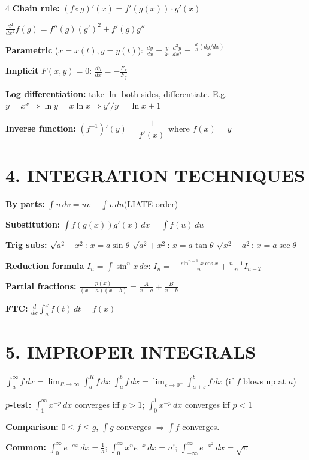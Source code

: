 \documentclass[8pt,a4paper,landscape]{extarticle}
\newcommand{\dx}{\,dx}
\begin{document}
\begin{multicols}{4}
\textbf{Chain rule:} $(f\circ g)'(x)=f'(g(x))\cdot g'(x)$

$\frac{d^2}{dx^2}f(g)=f''(g)(g')^2+f'(g)g''$

\textbf{Parametric} ($x=x(t),y=y(t)$):
$\frac{dy}{dx}=\frac{\dot y}{\dot x}$\qquad
$\frac{d^2y}{dx^2}=\frac{\frac{d}{dt}(dy/dx)}{\dot x}$

\textbf{Implicit} $F(x,y)=0$: $\frac{dy}{dx}=-\frac{F_x}{F_y}$

\textbf{Log differentiation:} take $\ln$ both sides, differentiate.
E.g.\ $y=x^x\Rightarrow\ln y=x\ln x\Rightarrow y'/y=\ln x+1$

\textbf{Inverse function:} $(f^{-1})'(y)=\dfrac{1}{f'(x)}$ where $f(x)=y$

\section*{4. INTEGRATION TECHNIQUES}

\textbf{By parts:} $\int u\,dv=uv-\int v\,du$\quad (LIATE order)

\textbf{Substitution:} $\int f(g(x))g'(x)\dx=\int f(u)\,du$

\textbf{Trig subs:}
$\sqrt{a^2-x^2}$: $x=a\sin\theta$\quad
$\sqrt{a^2+x^2}$: $x=a\tan\theta$\quad
$\sqrt{x^2-a^2}$: $x=a\sec\theta$

\textbf{Reduction formula} $I_n=\int\sin^n x\dx$:
$I_n=-\frac{\sin^{n-1}x\cos x}{n}+\frac{n-1}{n}I_{n-2}$

\textbf{Partial fractions:} $\frac{p(x)}{(x-a)(x-b)}=\frac{A}{x-a}+\frac{B}{x-b}$

\textbf{FTC:} $\frac{d}{dx}\int_a^x f(t)\,dt=f(x)$

\section*{5. IMPROPER INTEGRALS}

$\int_a^\infty f\dx=\lim_{R\to\infty}\int_a^R f\dx$\quad
$\int_a^b f\dx=\lim_{\varepsilon\to0^+}\int_{a+\varepsilon}^b f\dx$ (if $f$ blows up at $a$)

\textbf{$p$-test:} $\int_1^\infty x^{-p}\dx$ converges iff $p>1$;\quad
$\int_0^1 x^{-p}\dx$ converges iff $p<1$

\textbf{Comparison:} $0\leq f\leq g$, $\int g$ converges $\Rightarrow\int f$ converges.

\textbf{Common:} $\int_0^\infty e^{-ax}\dx=\frac{1}{a}$;\quad
$\int_0^\infty x^{n}e^{-x}\dx=n!$;\quad
$\int_{-\infty}^\infty e^{-x^2}\dx=\sqrt{\pi}$


\end{multicols}
\end{document}
